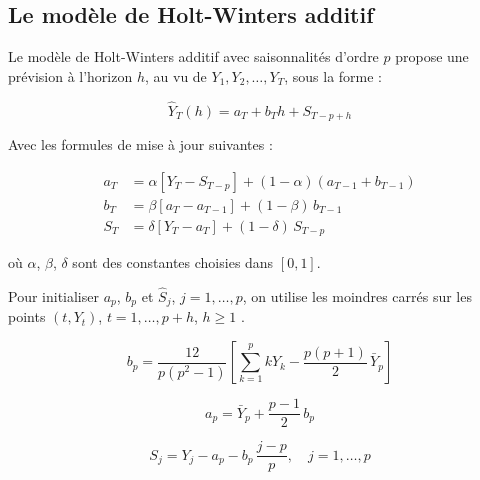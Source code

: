 \documentclass[
12pt,          %
a4paper,       %
oneside,       %
openright      %
]{report}
\begin{document}
\begin{table}[H]
	\centering
	
	\caption{Coefficients de lissage retenus pour Holt-Winters}
	\label{tab:coeff_lissage}
\end{table}


\subsection{Le modèle de Holt-Winters additif}

 
 Le modèle de Holt-Winters additif avec saisonnalités d'ordre $p$ 
 propose une prévision à l'horizon $h$, au vu de $Y_1, Y_2, \ldots, 
 Y_T$, sous la forme :
 
 \begin{equation}
 	\hat{Y}_T(h) = a_T + b_T h + S_{T-p+h}
 	\label{eq:hw_additif}
 \end{equation}
 
 Avec les formules de mise à jour suivantes :
 
 \begin{align}
 	a_T &= \alpha \left[Y_T - S_{T-p}\right] + 
 	(1 - \alpha)(a_{T-1} + b_{T-1}) 
 	\label{eq:hw_niveau} \\
 	b_T &= \beta \left[a_T - a_{T-1}\right] + 
 	(1 - \beta)\, b_{T-1} 
 	\label{eq:hw_tendance} \\
 	S_T &= \delta \left[Y_T - a_T\right] + 
 	(1 - \delta)\, S_{T-p} 
 	\label{eq:hw_saison}
 \end{align}
 
 où $\alpha$, $\beta$, $\delta$ sont des constantes choisies dans 
 $[0, 1]$.
 
 

 Pour initialiser $a_p$, $b_p$ et $\hat{S}_j$, $j = 1, \ldots, p$,
 on utilise les moindres carrés sur les points $(t, Y_t)$,
 $t = 1, \ldots, p + h$, $h \geq 1$ \citep{somda2026}.
 
 \begin{equation}
 	b_p = \frac{12}{p(p^2 - 1)}
 	\left[
 	\sum_{k=1}^{p} k Y_k - \frac{p(p+1)}{2}\,\bar{Y}_p
 	\right]
 	\label{eq:b_p}
 \end{equation}
 
 \begin{equation}
 	a_p = \bar{Y}_p + \frac{p-1}{2}\, b_p
 	\label{eq:a_p}
 \end{equation}
 
 \begin{equation}
 	S_j = Y_j - a_p - b_p\,\frac{j - p}{p}, \quad j = 1, \ldots, p
 	\label{eq:S_j}
 \end{equation}
 
\end{document}
